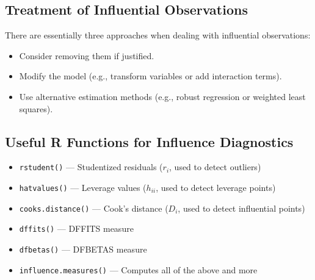 \subsection{Treatment of Influential Observations}

There are essentially three approaches when dealing with influential observations:

\begin{itemize}
\item Consider removing them if justified.

\item Modify the model (e.g., transform variables or add interaction terms).

\item Use alternative estimation methods (e.g., robust regression or weighted least squares).
\end{itemize}

\subsection{Useful R Functions for Influence Diagnostics}

\begin{notebox}
\begin{itemize}
\item \texttt{rstudent()} — Studentized residuals ($r_i$, used to detect outliers)

\item \texttt{hatvalues()} — Leverage values ($h_{ii}$, used to detect leverage points)

\item \texttt{cooks.distance()} — Cook's distance ($D_i$, used to detect influential points)

\item \texttt{dffits()} — DFFITS measure

\item \texttt{dfbetas()} — DFBETAS measure

\item \texttt{influence.measures()} — Computes all of the above and more
\end{itemize}
\end{notebox}

\clearpage

